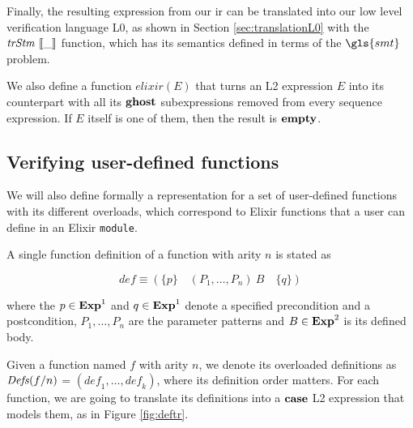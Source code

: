 Finally, the resulting expression from our \gls{ir} can be translated into our
low level verification language L0, as shown in Section \ref{sec:translationL0}
with the $\mathit{trStm}~\llbracket\_\rrbracket$ function, which has its semantics defined in terms of the
$\gls{smt}$ problem.

We also define a function $\mathit{elixir}(E)$ that turns an L2 expression $E$
into its counterpart with all its $\textbf{ghost}$ subexpressions removed from every 
sequence expression. If $E$ itself is one of them, then the result is $\textbf{empty}$.

\subsection{Verifying user-defined functions}
\label{sec:verifyuserdefined}

We will also define formally a representation for a set of user-defined
functions with its different overloads, which correspond to Elixir functions
that a user can define in an Elixir \verb|module|.

A single function definition of a function with arity $n$ is stated as

\[
\mathit{def} \equiv \left(\{ p \}  \quad (P_1, \dots, P_n)~B \quad \{ q \} \right)
\]

where the $p \in \mathbf{Exp}^{1}$ and $q \in \mathbf{Exp}^{1}$ denote a specified precondition
and a postcondition, $P_1, \dots, P_n$ are the parameter patterns and $B \in
\mathbf{Exp}^{2}$ is its defined body.

Given a function named $f$ with arity $n$, we denote its overloaded definitions
as $\mathit{Defs}(f/n)$ = $(\mathit{def}_1,\dots,\mathit{def}_k)$, where its definition
order matters. For each function, we are going to translate its definitions into
a $\textbf{case}$ L2 expression that models them, as in Figure \ref{fig:deftr}.

